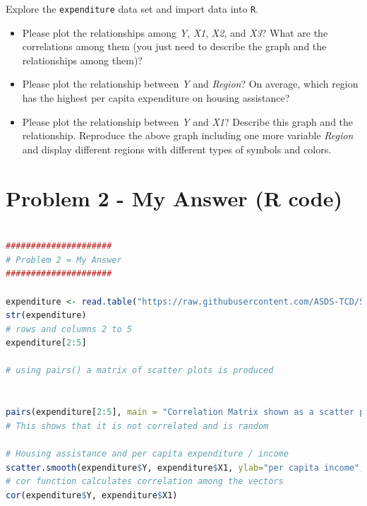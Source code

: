 \documentclass[12pt,letterpaper]{article}
\begin{document}
\vspace{.5cm}
\noindent Explore the \texttt{expenditure} data set and import data into \texttt{R}.
\vspace{.5cm}
  
\vspace{.5cm}
\begin{itemize}

\item
Please plot the relationships among \emph{Y}, \emph{X1}, \emph{X2}, and \emph{X3}? What are the correlations among them (you just need to describe the graph and the relationships among them)?
\vspace{.5cm}
\item
Please plot the relationship between \emph{Y} and \emph{Region}? On average, which region has the highest per capita expenditure on housing assistance?
\vspace{.5cm}
\item
Please plot the relationship between \emph{Y} and \emph{X1}? Describe this graph and the relationship. Reproduce the above graph including one more variable \emph{Region} and display different regions with different types of symbols and colors.
\end{itemize}

\newpage

\section*{Problem 2 - My Answer (R code)}
	


\begin{lstlisting}[language=R]

#####################
# Problem 2 = My Answer
#####################

expenditure <- read.table("https://raw.githubusercontent.com/ASDS-TCD/StatsI_Fall2021/main/datasets/expenditure.txt", header=T)
str(expenditure)
# rows and columns 2 to 5
expenditure[2:5]

# using pairs() a matrix of scatter plots is produced


pairs(expenditure[2:5], main = "Correlation Matrix shown as a scatter plot")
# This shows that it is not correlated and is random

# Housing assistance and per capita expenditure / income
scatter.smooth(expenditure$Y, expenditure$X1, ylab="per capita income", xlab = "housing assistance")
# cor function calculates correlation among the vectors
cor(expenditure$Y, expenditure$X1)


\end{lstlisting}
\end{document}
